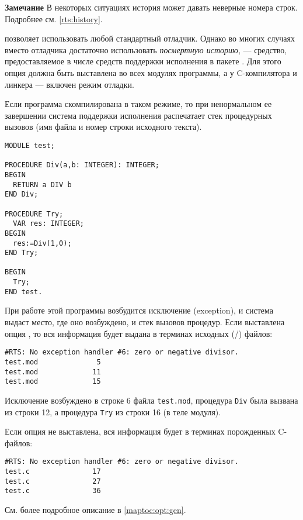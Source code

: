 {\bf Замечание} В некоторых ситуациях история может давать неверные
номера строк. Подробнее см. \ref{rts:history}.

\fi %

\ifgenc %

\XDS{} позволяет использовать любой стандартный отладчик.
Однако во многих случаях вместо отладчика достаточно использовать
{\em посмертную историю},
--- средство, предоставляемое в числе средств поддержки исполнения 
в пакете \XDS{}.
Для этого опция  должна быть выставлена во всех модулях
программы, а у C-компилятора и линкера --- включен режим отладки.

Если программа скомпилирована в таком режиме, то при ненормальном ее 
завершении система поддержки исполнения распечатает стек процедурных
вызовов (имя файла и номер строки исходного текста).

\Example
\begin{verbatim}
MODULE test;

PROCEDURE Div(a,b: INTEGER): INTEGER;
BEGIN
  RETURN a DIV b
END Div;

PROCEDURE Try;
  VAR res: INTEGER;
BEGIN
  res:=Div(1,0);
END Try;

BEGIN
  Try;
END test.
\end{verbatim}
При работе этой программы возбудится исключение (exception), 
и система выдаст место, где оно возбуждено, и стек вызовов процедур.
Если выставлена опция , то вся информация будет выдана
в терминах исходных (\ot{}/\mt{}) файлов:
\begin{verbatim}
#RTS: No exception handler #6: zero or negative divisor.
test.mod              5
test.mod             11
test.mod             15
\end{verbatim}
Исключение возбуждено в строке 6 файла {\tt test.mod},
процедура {\tt Div} была вызвана из строки 12,
а процедура {\tt Try} из строки 16
(в теле модуля).

Если опция  не выставлена, вся информация будет в терминах
порожденных C-файлов:
\begin{verbatim}
#RTS: No exception handler #6: zero or negative divisor.
test.c               17
test.c               27
test.c               36
\end{verbatim}
См. более подробное описание в \ref{maptoc:opt:gen}.

\fi %

